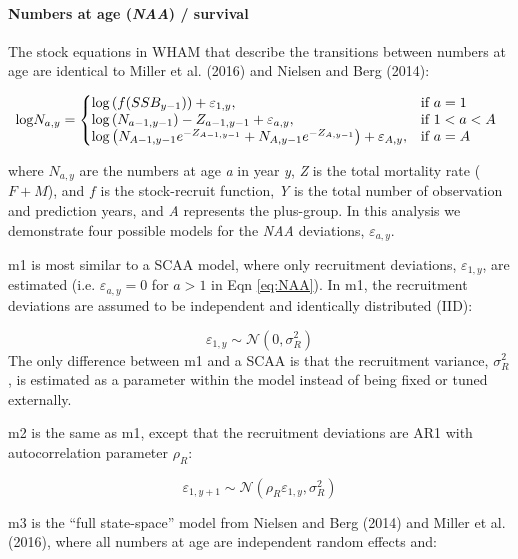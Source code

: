 \documentclass[]{article}
\let\oldparagraph\paragraph
\renewcommand{\paragraph}[1]{\oldparagraph{#1}\mbox{}}
\begin{document}
\hypertarget{numbers-at-age-naa-survival}{%
\paragraph{\texorpdfstring{Numbers at age (\emph{NAA}) /
survival}{Numbers at age (NAA) / survival}}\label{numbers-at-age-naa-survival}}

The stock equations in WHAM that describe the transitions between
numbers at age are identical to Miller et al. (2016) and Nielsen and
Berg (2014):

\begin{equation}
\label{eq:NAA}
  \text{log}N_{a,y}=\left\{
    \begin{array}{@{}lll@{}}
      \text{log} \left( f(SSB_{y-1}) \right) + \varepsilon_{1,y}, & \text{if}\ a = 1 \\
      \text{log} \left( N_{a-1,y-1} \right) - Z_{a-1,y-1} + \varepsilon_{a,y}, & \text{if}\ 1 < a < A \\
      \text{log} \left( N_{A-1,y-1} e^{-Z_{A-1,y-1}} + N_{A,y-1} e^{-Z_{A,y-1}} \right) + \varepsilon_{A,y}, & \text{if}\ a = A
    \end{array}\right.
\end{equation}

where \(N_{a,y}\) are the numbers at age \emph{a} in year \emph{y},
\emph{Z} is the total mortality rate (\(F + M\)), and \(f\) is the
stock-recruit function, \emph{Y} is the total number of observation and
prediction years, and \emph{A} represents the plus-group. In this
analysis we demonstrate four possible models for the \emph{NAA}
deviations, \(\varepsilon_{a,y}\).

m1 is most similar to a SCAA model, where only recruitment deviations,
\(\varepsilon_{1,y}\), are estimated (i.e. \(\varepsilon_{a,y} = 0\) for
\(a > 1\) in Eqn \ref{eq:NAA}). In m1, the recruitment deviations are
assumed to be independent and identically distributed (IID):

\[\varepsilon_{1,y} \sim \mathcal{N}(0, \sigma^2_R)\] The only
difference between m1 and a SCAA is that the recruitment variance,
\(\sigma^2_R\), is estimated as a parameter within the model instead of
being fixed or tuned externally.

m2 is the same as m1, except that the recruitment deviations are AR1
with autocorrelation parameter \(\rho_R\):

\[\varepsilon_{1,y+1} \sim \mathcal{N}(\rho_R \varepsilon_{1,y}, \sigma^2_R)\]

m3 is the ``full state-space'' model from Nielsen and Berg (2014) and
Miller et al. (2016), where all numbers at age are independent random
effects and:
\end{document}
